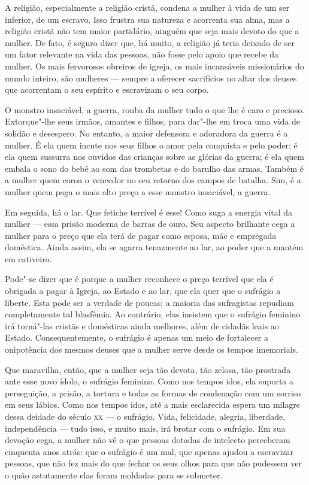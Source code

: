 A religião, especialmente a religião cristã, condena a mulher à vida de
um ser inferior, de um escravo. Isso frustra sua natureza e
acorrenta sua alma, mas a religião cristã não tem maior partidário,
ninguém que seja mais devoto do que a mulher. De fato, é seguro dizer
que, há muito, a religião já teria deixado de ser um fator relevante na vida das
pessoas, não fosse pelo apoio que recebe da mulher. Os mais fervorosos
obreiros de igreja, os mais incansáveis missionários ​​do mundo inteiro,
são mulheres --- sempre a oferecer sacrifícios no altar dos deuses que
acorrentam o seu espírito e escravizam o seu corpo.

O monstro insaciável, a guerra, rouba da mulher tudo o que lhe é caro e
precioso. Extorque"-lhe seus irmãos, amantes e filhos, para dar"-lhe em troca
uma vida de solidão e desespero. No entanto, a maior defensora e
adoradora da guerra é a mulher. É ela quem incute nos seus filhos o amor pela conquista e pelo poder; é ela quem sussurra nos ouvidos das crianças sobre as glórias da guerra; é ela quem embala o sono do bebê ao som das
trombetas e do barulho das armas. Também é a mulher quem coroa o vencedor no
seu retorno dos campos de batalha. Sim, é a mulher quem paga o mais alto
preço a esse monstro insaciável, a guerra.

Em seguida, há o lar. Que fetiche terrível é esse! Como suga a energia
vital da mulher --- essa prisão moderna de barras de ouro. Seu aspecto
brilhante cega a mulher para o preço que ela terá de pagar como esposa,
mãe e empregada doméstica. Ainda assim, ela se agarra tenazmente ao lar,
ao poder que a mantém em cativeiro.

Pode"-se dizer que é porque a mulher reconhece o preço terrível que ela é
obrigada a pagar à Igreja, ao Estado e ao lar, que ela quer que o
sufrágio a liberte. Esta pode ser a verdade de poucas; a maioria das
sufragistas repudiam completamente tal blasfêmia. Ao contrário, elas
insistem que o sufrágio feminino irá torná"-las cristãs e domésticas
ainda melhores, além de cidadãs leais ao Estado. Consequentemente, o
sufrágio é apenas um meio de fortalecer a onipotência dos mesmos deuses
que a mulher serve desde os tempos imemoriais.

Que maravilha, então, que a mulher seja tão devota, tão zelosa, tão
prostrada ante esse novo ídolo, o sufrágio feminino. Como nos tempos
idos, ela suporta a perseguição, a prisão, a tortura e todas as formas
de condenação com um sorriso em seus lábios. Como nos tempos idos, até a
mais esclarecida espera um milagre dessa deidade do século \textsc{xx} --- o
sufrágio. Vida, felicidade, alegria, liberdade, independência --- tudo
isso, e muito mais, irá brotar com o sufrágio. Em sua devoção cega, a
mulher não vê o que pessoas dotadas de intelecto perceberam cinquenta
anos atrás: que o sufrágio é um mal, que apenas ajudou a escravizar
pessoas, que não fez mais do que fechar os seus olhos para que não
pudessem ver o quão astutamente elas foram moldadas para se submeter.


